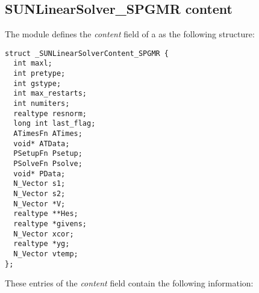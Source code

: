 \subsection{SUNLinearSolver\_SPGMR content}
\label{ss:sunlinsol_spgmr_content}

The {\sunlinsolspgmr} module defines the \textit{content} field of a
 as the following structure:
\begin{verbatim}
struct _SUNLinearSolverContent_SPGMR {
  int maxl;
  int pretype;
  int gstype;
  int max_restarts;
  int numiters;
  realtype resnorm;
  long int last_flag;
  ATimesFn ATimes;
  void* ATData;
  PSetupFn Psetup;
  PSolveFn Psolve;
  void* PData;
  N_Vector s1;
  N_Vector s2;
  N_Vector *V;
  realtype **Hes;
  realtype *givens;
  N_Vector xcor;
  realtype *yg;
  N_Vector vtemp;
};
\end{verbatim}
These entries of the \emph{content} field contain the following
information:
